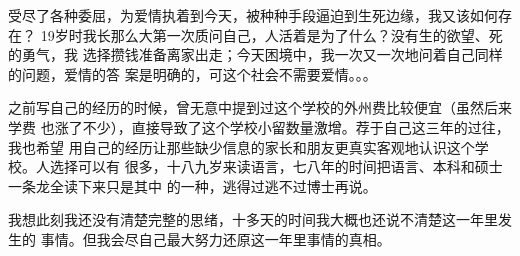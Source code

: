 \documentclass[12pt]{book}
\begin{document}
受尽了各种委屈，为爱情执着到今天，被种种手段逼迫到生死边缘，我又该如何存在？
19岁时我长那么大第一次质问自己，人活着是为了什么？没有生的欲望、死的勇气，我
选择攒钱准备离家出走；今天困境中，我一次又一次地问着自己同样的问题，爱情的答
案是明确的，可这个社会不需要爱情。。。

之前写自己的经历的时候，曾无意中提到过这个学校的外州费比较便宜（虽然后来学费
也涨了不少），直接导致了这个学校小留数量激增。荐于自己这三年的过往，我也希望
用自己的经历让那些缺少信息的家长和朋友更真实客观地认识这个学校。人选择可以有
很多，十八九岁来读语言，七八年的时间把语言、本科和硕士一条龙全读下来只是其中
的一种，逃得过逃不过博士再说。

我想此刻我还没有清楚完整的思绪，十多天的时间我大概也还说不清楚这一年里发生的
事情。但我会尽自己最大努力还原这一年里事情的真相。
\end{document}
